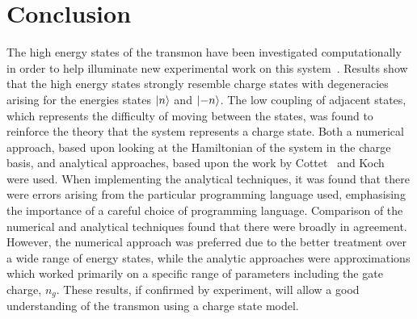 \documentclass[11pt]{article}
\begin{document}
\section{Conclusion}
The high energy states of the transmon have been investigated computationally in order to help illuminate new experimental work on this system~\cite{lescanneDynamicsOffresonantlyPumped2018}. Results show that the high energy states strongly resemble charge states with degeneracies arising for the energies states $\ket{n}$ and $\ket{-n}$. The low coupling of adjacent states, which represents the difficulty of moving between the states, was found to reinforce the theory that the system represents a charge state. Both a numerical approach, based upon looking at the Hamiltonian of the system in the charge basis, and analytical approaches, based upon the work by Cottet~\cite{cottetImplementationQuantumBit2002} and Koch~\cite{kochChargeinsensitiveQubitDesign2007} were used. When implementing the analytical techniques, it was found that there were errors arising from the particular programming language used, emphasising the importance of a careful choice of programming language. Comparison of the numerical and analytical techniques found that there were broadly in agreement. However, the numerical approach was preferred due to the better treatment over a wide range of energy states, while the analytic approaches were approximations which worked primarily on a specific range of parameters including the gate charge, $n_g$. These results, if confirmed by experiment, will allow a good understanding of the transmon using a charge state model.

\clearpage


\appendix
\end{document}
